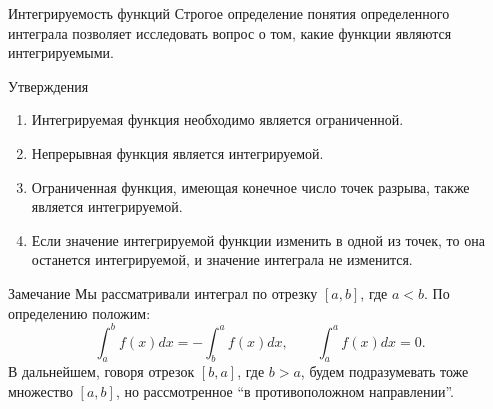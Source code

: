 \documentclass[8pt]{beamer}
\begin{document}
\begin{frame}{Интегрируемость функций}
Строгое определение понятия определенного интеграла позволяет исследовать вопрос о том, какие функции являются интегрируемыми.
\begin{block}{Утверждения}
\begin{enumerate}
\item
Интегрируемая функция необходимо является ограниченной.
\item
Непрерывная функция является интегрируемой.
\item
Ограниченная функция, имеющая конечное число точек разрыва, также является интегрируемой.
\item Если значение интегрируемой функции изменить в одной из точек, то она останется интегрируемой, и значение интеграла не изменится.
\end{enumerate}
\end{block}
\begin{block}{Замечание}
Мы рассматривали интеграл по отрезку $[a,b]$, где $a<b$. По определению положим:
$$\int_a^b f(x)dx= - \int_b^a f(x)dx,\qquad \int_a^a f(x)dx=0.$$ 
В дальнейшем, говоря отрезок  $[b,a]$, где $ b>a$,  будем подразумевать тоже множество $[a,b]$,  но рассмотренное ``в противоположном направлении''.
\end{block}
\end{frame}

\end{document}
